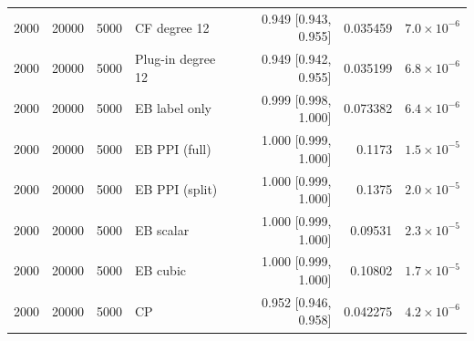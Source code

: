 {\begin{longtable}{rrrlrrr}
2000 & 20000 & 5000 & CF degree 12 & 0.949 [0.943, 0.955] & 0.035459 & $7.0\times 10^{-6}$ \\
2000 & 20000 & 5000 & Plug-in degree 12 & 0.949 [0.942, 0.955] & 0.035199 & $6.8\times 10^{-6}$ \\
2000 & 20000 & 5000 & EB label only & 0.999 [0.998, 1.000] & 0.073382 & $6.4\times 10^{-6}$ \\
2000 & 20000 & 5000 & EB PPI (full) & 1.000 [0.999, 1.000] & 0.1173 & $1.5\times 10^{-5}$ \\
2000 & 20000 & 5000 & EB PPI (split) & 1.000 [0.999, 1.000] & 0.1375 & $2.0\times 10^{-5}$ \\
2000 & 20000 & 5000 & EB scalar & 1.000 [0.999, 1.000] & 0.09531 & $2.3\times 10^{-5}$ \\
2000 & 20000 & 5000 & EB cubic & 1.000 [0.999, 1.000] & 0.10802 & $1.7\times 10^{-5}$ \\
2000 & 20000 & 5000 & CP & 0.952 [0.946, 0.958] & 0.042275 & $4.2\times 10^{-6}$ \\
\end{longtable}}
